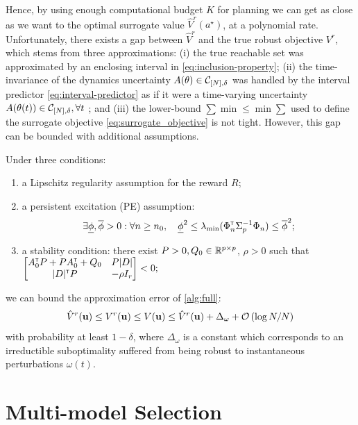 \documentclass{article}
\begin{document}
Hence, by using enough computational budget $K$ for planning we can get as close as we want to the optimal surrogate value $\hat{V}^r(a^{\star})$, at a polynomial rate. Unfortunately, there exists a gap between $\hat{V}^r$ and the true robust objective $V^r$, which stems from three approximations: (i) the true reachable set was approximated by an enclosing interval in \eqref{eq:inclusion-property}; (ii) the time-invariance of the dynamics uncertainty $A(\theta)\in\mathcal{C}_{[N],\delta}$ was handled by the interval predictor \eqref{eq:interval-predictor} as if it were a time-varying uncertainty $A(\theta(t))\in\mathcal{C}_{[N],\delta},\forall t$ ; and (iii) the lower-bound $\sum\min\leq \min\sum$ used to define the surrogate objective \eqref{eq:surrogate_objective} is not tight. However, this gap can be bounded with additional assumptions.
\begin{theorem}
\label{thm:control-error}
Under three conditions:
\begin{enumerate}
	\item a Lipschitz regularity assumption for the reward $R$;
	\item a persistent excitation (PE) assumption:
	\begin{align*}
	\exists \underline{\phi},\overline{\phi}>0: \forall n\geq n_0,\quad \underline{\phi}^2 \leq \lambda_{\min}(\Phi_{n}^{\mathsf{\scriptscriptstyle T}}\Sigma_{p}^{-1}\Phi_{n}) \leq \overline{\phi}^2;
	\end{align*}
	\item a stability condition: there exist $P>0,Q_0\in\mathbb{R}^{p\times p}$, $\rho>0$ such that
	$\begin{bmatrix}
		A_0^{\mathsf{\scriptscriptstyle T}} P + P A_0^{\mathsf{\scriptscriptstyle T}} + Q_0 & P|D|  \\
		|D|^{\mathsf{\scriptscriptstyle T}} P & -\rho I_r \\
	\end{bmatrix}< 0;$
\end{enumerate}
 we can bound the approximation error of \autoref{alg:full}:
\begin{equation*}
\hat{V}^r(\mathbf{u}) \leq {V}^r(\mathbf{u}) \leq V(\mathbf{u}) \leq \hat{V}^r(\mathbf{u}) + \Delta_\omega + \mathcal{O}\left({\log N / N}\right)
\end{equation*}
with probability at least $1-\delta$, where $\Delta_\omega$ is a constant which corresponds to an irreductible suboptimality suffered from being robust to instantaneous perturbations $\omega(t)$.
\end{theorem}


\section{Multi-model Selection}
\label{sec:multi-model}
\end{document}
